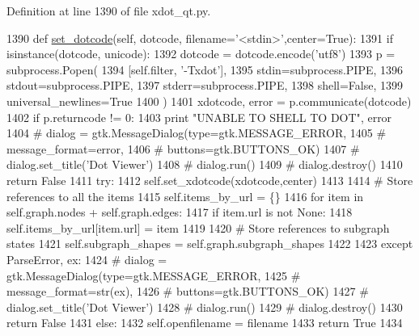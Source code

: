 Definition at line 1390 of file xdot\+\_\+qt.\+py.


\begin{DoxyCode}
1390     \textcolor{keyword}{def }\hyperlink{namespacesmacc__viewer_1_1xdot_1_1xdot__qt_ace6bbb2ed7b95a7c61d788f42cf7fd8f}{set\_dotcode}(self, dotcode, filename='<stdin>',center=True):
1391         \textcolor{keywordflow}{if} isinstance(dotcode, unicode):
1392             dotcode = dotcode.encode(\textcolor{stringliteral}{'utf8'})
1393         p = subprocess.Popen(
1394             [self.filter, \textcolor{stringliteral}{'-Txdot'}],
1395             stdin=subprocess.PIPE,
1396             stdout=subprocess.PIPE,
1397             stderr=subprocess.PIPE,
1398             shell=\textcolor{keyword}{False},
1399             universal\_newlines=\textcolor{keyword}{True}
1400         )
1401         xdotcode, error = p.communicate(dotcode)
1402         \textcolor{keywordflow}{if} p.returncode != 0:
1403             \textcolor{keywordflow}{print} \textcolor{stringliteral}{"UNABLE TO SHELL TO DOT"}, error
1404 \textcolor{comment}{#            dialog = gtk.MessageDialog(type=gtk.MESSAGE\_ERROR,}
1405 \textcolor{comment}{#                                       message\_format=error,}
1406 \textcolor{comment}{#                                       buttons=gtk.BUTTONS\_OK)}
1407 \textcolor{comment}{#            dialog.set\_title('Dot Viewer')}
1408 \textcolor{comment}{#            dialog.run()}
1409 \textcolor{comment}{#            dialog.destroy()}
1410             \textcolor{keywordflow}{return} \textcolor{keyword}{False}
1411         \textcolor{keywordflow}{try}:
1412             self.set\_xdotcode(xdotcode,center)
1413 
1414             \textcolor{comment}{# Store references to all the items}
1415             self.items\_by\_url = \{\}
1416             \textcolor{keywordflow}{for} item \textcolor{keywordflow}{in} self.graph.nodes + self.graph.edges:
1417                 \textcolor{keywordflow}{if} item.url \textcolor{keywordflow}{is} \textcolor{keywordflow}{not} \textcolor{keywordtype}{None}:
1418                     self.items\_by\_url[item.url] = item
1419 
1420             \textcolor{comment}{# Store references to subgraph states}
1421             self.subgraph\_shapes = self.graph.subgraph\_shapes
1422 
1423         \textcolor{keywordflow}{except} ParseError, ex:
1424 \textcolor{comment}{#            dialog = gtk.MessageDialog(type=gtk.MESSAGE\_ERROR,}
1425 \textcolor{comment}{#                                       message\_format=str(ex),}
1426 \textcolor{comment}{#                                       buttons=gtk.BUTTONS\_OK)}
1427 \textcolor{comment}{#            dialog.set\_title('Dot Viewer')}
1428 \textcolor{comment}{#            dialog.run()}
1429 \textcolor{comment}{#            dialog.destroy()}
1430             \textcolor{keywordflow}{return} \textcolor{keyword}{False}
1431         \textcolor{keywordflow}{else}:
1432             self.openfilename = filename
1433             \textcolor{keywordflow}{return} \textcolor{keyword}{True}
1434 
\end{DoxyCode}

